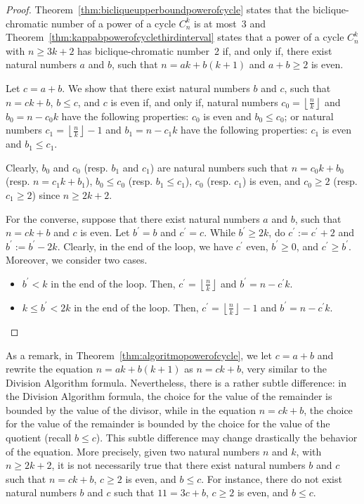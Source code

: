 \documentclass{article}
\begin{document}
\begin{proof}

Theorem~\ref{thm:bicliqueupperboundpowerofcycle} states that the
biclique-chromatic number of a power of a cycle $C_n^k$ is at most~3 and
Theorem~\ref{thm:kappabpowerofcyclethirdinterval} states that a power of a cycle
$C_n^k$ with $n \geq 3k + 2$ has biclique-chromatic number~2 if, and only if,
there exist natural numbers $a$ and $b$, such that $n = ak + b(k+1)$ and $a + b
\geq 2$ is even.

Let $c = a + b$. We show that there exist natural numbers $b$ and $c$, such that
$n = ck + b$, $b \leq c$, and $c$ is even if, and only if, natural numbers $c_0 =
\left\lfloor\frac{n}{k}\right\rfloor$ and $b_0 = n - c_0 k$ have the
following properties: $c_0$ is even and $b_0 \leq c_0$; or 
natural numbers $c_1 = \left\lfloor\frac{n}{k}\right\rfloor - 1$ and $b_1 = n -
c_1 k$ have the following properties: $c_1$ is even and $b_1 \leq c_1$. 

Clearly, $b_0$ and $c_0$ (resp. $b_1$ and $c_1$) are natural numbers such that
$n = c_0 k + b_0$ (resp. $n = c_1 k + b_1$), $b_0 \leq c_0$ (resp. $b_1 \leq
c_1$), $c_0$ (resp. $c_1$) is even, and $c_0 \geq 2$ (resp. $c_1 \geq 2$) since $n
\geq 2k + 2$.

For the converse, suppose that there exist natural numbers $a$ and $b$, such
that $n = ck + b$ and $c$ is even. Let $b^\prime = b$ and $c^\prime = c$. While $b^\prime
\geq 2k$, do $c^\prime := c^\prime + 2$ and $b^\prime := b^\prime - 2k$.
Clearly, in the end of the loop, we have $c^\prime$ even, $b^\prime \geq 0$, and
$c^\prime \geq b^\prime$. Moreover, we consider two cases.

\begin{itemize}
  \item $b^\prime < k$ in the end of the loop. Then, $c^\prime =
  \left\lfloor\frac{n}{k}\right\rfloor$ and $b^\prime = n - c^\prime k$.
  \item $k \leq b^\prime < 2k$ in the end of the loop. Then, $c^\prime =
  \left\lfloor\frac{n}{k}\right\rfloor - 1$ and $b^\prime = n - c^\prime k$.
\end{itemize}
\end{proof}

As a remark, in Theorem~\ref{thm:algoritmopowerofcycle},
we let $c = a + b$ and rewrite the equation $n = ak + b(k+1)$ as $n = ck + b$,
very similar to the Division Algorithm formula. Nevertheless, there is a rather
subtle difference: in the Division Algorithm formula, the choice for the
value of the remainder is bounded by the value of the divisor, while in the
equation $n = ck + b$, the choice for the value of the remainder is bounded by
the choice for the value of the quotient (recall $b \leq c$). This subtle
difference may change drastically the behavior of the equation. More precisely,
given two natural numbers $n$ and $k$, with $n \geq 2k + 2$, it is not
necessarily true that there exist natural numbers $b$ and $c$ such that $n = ck
+ b$, $c \geq 2$ is even, and $b \leq c$. For instance, there do not exist
natural numbers $b$ and $c$ such that $11 = 3c + b$, $c \geq 2$ is even, and $b
\leq c$.
\end{document}

